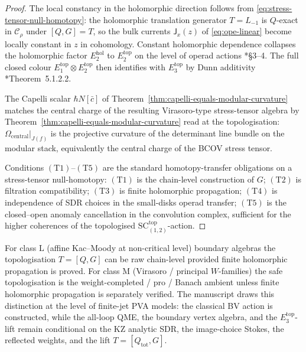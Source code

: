 \begin{proof}
The local constancy in the holomorphic direction follows from
\eqref{eq:stress-tensor-null-homotopy}: the holomorphic translation
generator \(T=L_{-1}\) is \(Q\)-exact in \(\mathcal C_\rho\) under
\([Q,G]=T\), so the bulk currents
\(\mathsf J_x(z)\) of \eqref{eq:ope-linear} become locally constant in
\(z\) in cohomology.  Constant holomorphic dependence collapses the
holomorphic factor \(E_2^{\mathrm{hol}}\) to \(E_2^{\mathrm{top}}\) on
the level of operad actions
\cite{costello-li-quantum-bcov}*{\S 3--4}.  The full closed colour
\(E_1^{\mathrm{top}}\otimes E_2^{\mathrm{top}}\) then identifies with
\(E_3^{\mathrm{top}}\) by Dunn additivity
\cite{lurie-ha}*{Theorem~5.1.2.2}.

The Capelli scalar \(\hbar N[\bar c]\) of
Theorem~\ref{thm:capelli-equals-modular-curvature} matches the central
charge of the resulting Virasoro-type stress-tensor algebra by
Theorem~\ref{thm:capelli-equals-modular-curvature} read at the
topologisation: \(\Omega_{\mathrm{central}}|_{J(f)}\) is the
projective curvature of the determinant line bundle on the modular
stack, equivalently the central charge of the BCOV stress tensor.

Conditions \((\mathrm{T1})\)--\((\mathrm{T5})\) are the standard
homotopy-transfer obligations on a stress-tensor null-homotopy:
\((\mathrm{T1})\) is the chain-level construction of \(G\);
\((\mathrm{T2})\) is filtration compatibility; \((\mathrm{T3})\) is
finite holomorphic propagation; \((\mathrm{T4})\) is independence of
SDR choices in the small-disks operad transfer; \((\mathrm{T5})\) is
the closed--open anomaly cancellation in the convolution complex,
sufficient for the higher coherences of the topologised
\(\mathrm{SC}^{\mathrm{top}}_{(1,2)}\)-action.
\end{proof}

\begin{rmk}
\label{rmk:class-L-vs-class-M}
For class \(\mathrm L\) (affine Kac--Moody at non-critical level)
boundary algebras the topologisation \(T=[Q,G]\) can be raw
chain-level provided finite holomorphic propagation is proved.  For
class \(\mathrm M\) (Virasoro / principal \(W\)-families) the safe
topologisation is the weight-completed / pro / Banach ambient unless
finite holomorphic propagation is separately verified.  The
manuscript draws this distinction at the level of finite-jet PVA
models: the classical BV action is constructed, while the all-loop
QME, the boundary vertex algebra, and the \(E_3^{\mathrm{top}}\)-lift
remain conditional on the KZ analytic SDR, the image-choice Stokes,
the reflected weights, and the lift \(T=[Q_{\mathrm{tot}},G]\).
\end{rmk}

